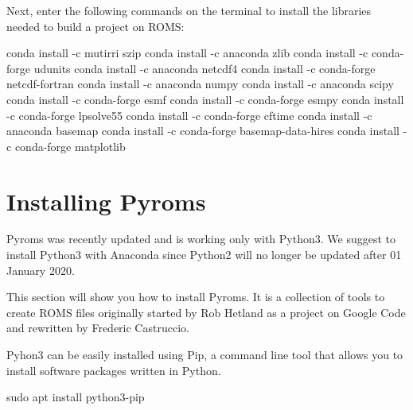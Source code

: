 Next, enter the following commands on the terminal to install the libraries needed to build a project on ROMS:
\bigskip

\begin{bashcode}
conda install -c mutirri szip
conda install -c anaconda zlib
conda install -c conda-forge udunits
conda install -c anaconda netcdf4
conda install -c conda-forge netcdf-fortran
conda install -c anaconda numpy
conda install -c anaconda scipy
conda install -c conda-forge esmf
conda install -c conda-forge esmpy 
conda install -c conda-forge lpsolve55 
conda install -c conda-forge cftime
conda install -c anaconda basemap 
conda install -c conda-forge basemap-data-hires 
conda install -c conda-forge matplotlib 
\end{bashcode}
\bigskip

\section{Installing Pyroms}
\bigskip

\begin{tcolorbox}[enhanced,
    grow to left by   = 0cm,
    grow to right by  = 0cm,
    enlarge top by    = 0cm,
    enlarge bottom by = 0cm,
    tcbox raise base,
    boxrule           = 1.0pt,
    left              = 18mm,
    colframe          = red!50!black,coltext=red!25!black,colback=red!10!white,
    overlay           = {\begin{tcbclipinterior}\fill[red!75!blue!50!white] (frame.south west)
      rectangle node[text=white,font=\sffamily\bfseries\footnotesize,rotate=0] {WARNING} ([xshift=18mm]frame.north west);\end{tcbclipinterior}}]
Pyroms was recently updated and is working only with Python3. We suggest to install Python3 with Anaconda since Python2 will no longer be updated after 01 January 2020.
  \end{tcolorbox}
\bigskip

This section will show you how to install Pyroms. It is a collection of tools to create ROMS files originally started by Rob Hetland as a
project on Google Code and rewritten by Frederic Castruccio.
\bigskip

Pyhon3 can be easily installed using Pip, a command line tool that allows you to install software packages written in Python.
\bigskip

\begin{bashcode}
sudo apt install python3-pip
\end{bashcode}
\bigskip


